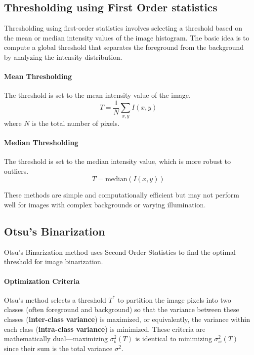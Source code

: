 \subsection{Thresholding using First Order statistics}
Thresholding using first-order statistics involves selecting a threshold based on the mean or median intensity values of the image histogram. The basic idea is to compute a global threshold that separates the foreground from the background by analyzing the intensity distribution.

\paragraph{Mean Thresholding} The threshold is set to the mean intensity value of the image.
   \[
   T = \frac{1}{N} \sum_{x,y} I(x,y)
   \]
   where \(N\) is the total number of pixels.

\paragraph{Median Thresholding} The threshold is set to the median intensity value, which is more robust to outliers.
   \[
   T = \text{median}(I(x,y))
   \]

These methods are simple and computationally efficient but may not perform well for images with complex backgrounds or varying illumination.

\subsection{Otsu’s Binarization}

Otsu's Binarization method uses Second Order Statistics to find the optimal threshold for image binarization.


\paragraph{Optimization Criteria}

Otsu’s method selects a threshold $T^*$ to partition the image pixels into two classes (often foreground and background) so that the variance between these classes (\textbf{inter-class variance}) is maximized, or equivalently, the variance within each class (\textbf{intra-class variance}) is minimized. These criteria are mathematically dual—maximizing $\sigma_b^2(T)$ is identical to minimizing $\sigma_w^2(T)$ since their sum is the total variance $\sigma^2$.

